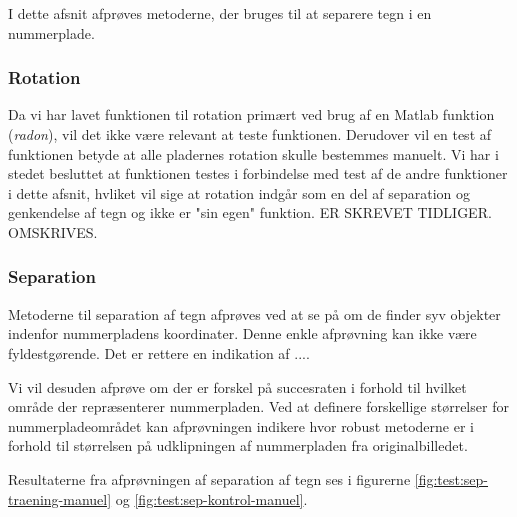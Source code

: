 
I dette afsnit afprøves metoderne, der bruges til at separere tegn i en nummerplade.

\subsubsection*{Rotation}

Da vi har lavet funktionen til rotation primært ved brug af en Matlab funktion (\textit{radon}), vil det ikke være relevant at teste funktionen. Derudover vil en test af funktionen betyde at alle pladernes rotation skulle bestemmes manuelt. Vi har i stedet besluttet at funktionen testes i forbindelse med test af de andre funktioner i dette afsnit, hvliket vil sige at rotation indgår som en del af separation og genkendelse af tegn og ikke er "sin egen" funktion. ER SKREVET TIDLIGER. OMSKRIVES.

\subsubsection*{Separation}
Metoderne til separation af tegn afprøves ved at se på om de finder syv objekter indenfor nummerpladens koordinater. Denne enkle afprøvning kan ikke være fyldestgørende. Det er rettere en indikation af ....

Vi vil desuden afprøve om der er forskel på succesraten i forhold til hvilket område der repræsenterer nummerpladen. Ved at definere forskellige størrelser for nummerpladeområdet kan afprøvningen indikere hvor robust metoderne er i forhold til størrelsen på udklipningen af nummerpladen fra originalbilledet.


Resultaterne fra afprøvningen af separation af tegn ses i figurerne \vref{fig:test:sep-traening-manuel} og \vref{fig:test:sep-kontrol-manuel}.

